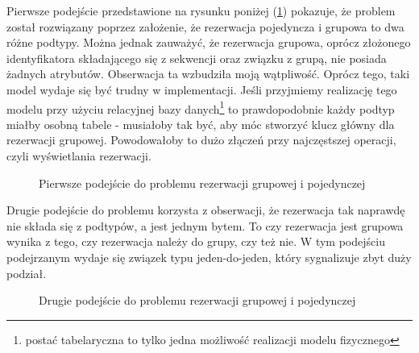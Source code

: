 \documentclass[a4paper,onecolumn,oneside,11pt,wide,floatssmall]{mwrep}
\theoremstyle{definition}
\theoremstyle{plain}%
\theoremstyle{remark}
\begin{document}
Pierwsze podejście przedstawione na rysunku poniżej (\ref{fig:db-logical-model-group-reservation-first-try}) pokazuje, że problem został rozwiązany poprzez założenie, że rezerwacja pojedyncza i grupowa to dwa różne podtypy. Można jednak zauważyć, że rezerwacja grupowa, oprócz złożonego identyfikatora składającego się z sekwencji oraz związku z grupą, nie posiada żadnych atrybutów. Obserwacja ta wzbudziła moją wątpliwość. Oprócz tego, taki model wydaje się być trudny w implementacji. Jeśli przyjmiemy realizację tego modelu przy użyciu relacyjnej bazy danych\footnote{postać tabelaryczna to tylko jedna możliwość realizacji modelu fizycznego} to prawdopodobnie każdy podtyp miałby osobną tabele - musiałoby tak być, aby móc stworzyć klucz główny dla rezerwacji grupowej. Powodowałoby to dużo złączeń przy najczęstszej operacji, czyli wyświetlania rezerwacji.

\begin{figure}[H]
  \begin{center}
  \end{center}
  \caption{Pierwsze podejście do problemu rezerwacji grupowej i pojedynczej}
  \label{fig:db-logical-model-group-reservation-first-try}
\end{figure}

Drugie podejście do problemu korzysta z obserwacji, że rezerwacja tak naprawdę nie składa się z podtypów, a jest jednym bytem. To czy rezerwacja jest grupowa wynika z tego, czy rezerwacja należy do grupy, czy też nie. W tym podejściu podejrzanym wydaje się związek typu jeden-do-jeden, który sygnalizuje zbyt duży podział. 

\begin{figure}[H]
  \begin{center}
  \end{center}
  \caption{Drugie podejście do problemu rezerwacji grupowej i pojedynczej}
  \label{fig:db-logical-model-group-reservation-second-try}
\end{figure}
\end{document}
